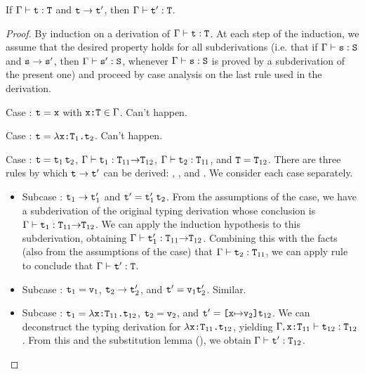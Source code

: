 \documentclass[11pt,twoside=off,numbers=noenddot]{scrbook}
\begin{document}
\begin{theorem}[Preservation]
  If $\Gamma \vdash \texttt{t} : \texttt{T}$ and $\texttt{t} \rightarrow
  \texttt{t}'$, then $\Gamma \vdash \texttt{t}' : \texttt{T}$.
\end{theorem}

\begin{proof}
  By induction on a derivation of $\Gamma \vdash \texttt{t} : \texttt{T}$.
  At each step of the induction, we assume that the desired property
  holds for all subderivations (i.e. that if $\Gamma \vdash \texttt{s} :
    \texttt{S}$ and $\texttt{s} \rightarrow \texttt{s}'$, then $\Gamma \vdash
    \texttt{s}' : \texttt{S}$, whenever $\Gamma \vdash \texttt{s} : \texttt{S}$ is
  proved by a subderivation of the present one) and proceed by case
  analysis on the last rule used in the derivation.

  Case : $\texttt{t} = \texttt{x}$ with $\texttt{x:T} \in \Gamma$.
  Can't happen.

  Case : $\texttt{t} =
  \texttt{$\lambda$x:$\texttt{T}_1$.$\texttt{t}_2$}$. Can't happen.

  Case : $\texttt{t} = \texttt{$\texttt{t}_1$\,$\texttt{t}_2$}$, $\Gamma
  \vdash \texttt{t}_1 :
  \texttt{$\texttt{T}_{11}$$\rightarrow$$\texttt{T}_{12}$}$, $\Gamma \vdash
  \texttt{t}_2 : \texttt{T}_{11}$, and $\texttt{T} = \texttt{T}_{12}$. There are
  three rules by which $\texttt{t} \rightarrow \texttt{t}'$ can be derived:
  , , and . We consider each
  case separately.
  \begin{itemize}
    \item Subcase : $\texttt{t}_1 \rightarrow \texttt{t}_1'$
      and $\texttt{t}' = \texttt{$\texttt{t}_1'$\,$\texttt{t}_2$}$. From the assumptions of
      the  case, we have a subderivation of the original
      typing derivation whose conclusion is $\Gamma \vdash \texttt{t}_1
      : \texttt{$\texttt{T}_{11}$$\rightarrow$$\texttt{T}_{12}$}$. We can
      apply the induction hypothesis to this subderivation, obtaining
      $\Gamma \vdash \texttt{t}_1' :
      \texttt{$\texttt{T}_{11}$$\rightarrow$$\texttt{T}_{12}$}$. Combining
      this with the facts (also from the assumptions of the
       case) that $\Gamma \vdash \texttt{t}_2 :
      \texttt{T}_{11}$, we can apply rule  to conclude that
      $\Gamma \vdash \texttt{t}' : \texttt{T}$.
    \item Subcase : $\texttt{t}_1 = \texttt{v}_1$, $\texttt{t}_2
      \rightarrow \texttt{t}_2'$, and $\texttt{t}' = \texttt{v}_1 \texttt{t}_2'$. Similar.
    \item Subcase : $\texttt{t}_1 =
      \texttt{$\lambda$x:$\texttt{T}_{11}$.$\texttt{t}_{12}$}$, $\texttt{t}_2 =
      \texttt{v}_2$, and $\texttt{t}' =
      \texttt{[x$\mapsto$$\texttt{v}_2$]$\texttt{t}_{12}$}$. We can
      deconstruct the typing derivation for
      $\texttt{$\lambda$x:$\texttt{T}_{11}$.$\texttt{t}_{12}$}$, yielding
      $\Gamma, \texttt{x:$\texttt{T}_{11}$} \vdash \texttt{t}_{12} :
      \texttt{T}_{12}$. From this and the substitution lemma
      (), we
      obtain $\Gamma \vdash \texttt{t}' : \texttt{T}_{12}$.
  \end{itemize}
\end{proof}
\end{document}
